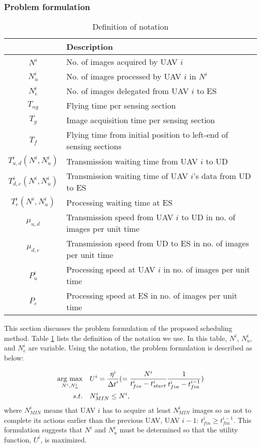\documentclass[journal]{IEEEtran}
\newcommand{\argmax}{\mathop{\rm arg~max}\limits}
\begin{document}
\subsubsection{Problem formulation}

\begin{table}[t]
\centering
\caption{Definition of notation}
  \begin{tabular}{|c||p{6cm}|} \hline
 & Description
 \\ \hline
 $N^i$ & No. of images acquired by UAV $i$ \\ \hline
 $N_u^i$ & No. of images processed by UAV $i$ in $N^i$ \\ \hline
 $N_e^i$ & No. of images delegated from UAV $i$ to ES   \\ \hline
 $T_{ng}$ & Flying time per sensing section  \\ \hline
 $T_g$ & Image acquisition time per sensing section \\ \hline
 $T_f$ & Flying time from initial position to left-end of sensing sections \\ \hline
 $T_{u,d}^{i}(N^i,N_u^i)$ & Transmission waiting time from UAV $i$ to UD  \\ \hline
 $T_{d,e}^{i}(N^i,N_u^i)$ & Transmission waiting time of UAV $i$'s data from UD to ES  \\ \hline
 $T_e^{i}(N^i,N_u^i)$ & Processing waiting time at ES  \\ \hline
 $\mu_{u,d}$ & Transmission speed from UAV $i$ to UD in no. of images per unit time \\ \hline
 $\mu_{d,e}$ & Transmission speed from UD to ES in no. of images per unit time \\ \hline
 $P_u^i$ & Processing speed at UAV $i$ in no. of images per unit time \\ \hline
 $P_e$ &  Processing speed at ES in no. of images per unit time \\ \hline
\end{tabular}
\label{para}
\end{table}

This section discusses the problem formulation of the proposed scheduling method.
%
Table \ref{para} lists the definition of the notation we use.
%
In this table, $N^i$, $N_u^i$, and $N_e^i$ are variable.
%
Using the notation, the problem formulation is described as below:

\begin{align}
\argmax_{N^i,N_u^i} \quad&  U^i = \frac{\eta^{i}}{{\Delta{t}}^i}(=\frac{N^i}{{t_{fin}^i}-{t_{start}^i}}\frac{1}{{t_{fin}^i}-{t_{fin}^{i-1}}})\label{eq1}\\
s.t. \quad& {N_{MIN}^i}\leq{N^i},  \label{eq2}
\end{align}
where $N_{MIN}^i$ means that UAV $i$ has to acquire at least $N_{MIN}^i$ images so as not to complete its actions earlier than the previous UAV, UAV $i-1$: ${t_{fin}^i}\geq{t_{fin}^{i-1}}$.
This formulation suggests that $N^i$ and $N_u^i$ must be determined so that the utility function, $U^i$, is maximized.
\end{document}
